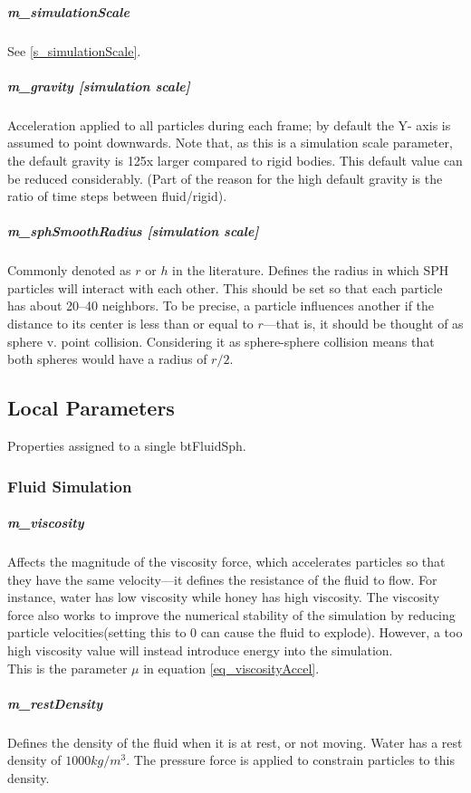 \documentclass[]{article}
\begin{document}
		\subparagraph{m\_simulationScale}
			See \ref{s_simulationScale}.
		
		\subparagraph{m\_gravity [simulation scale] }
			Acceleration applied to all particles during each frame; by default the Y- axis is assumed to point downwards.
			Note that, as this is a simulation scale parameter, the default gravity is 125x larger compared to rigid bodies. 
			This default value can be reduced considerably. (Part of the reason for the high default gravity is the ratio of 
			time steps between fluid/rigid).
		
		\subparagraph{m\_sphSmoothRadius [simulation scale]}
			Commonly denoted as \(r\) or \(h\) in the literature. Defines the radius in which SPH particles will 
			interact with each other. This should be set so that each particle has about 20--40 neighbors. To be precise, 
			a particle influences another if the distance to its center is less than or equal to \(r\)---that is, it 
			should be thought of as sphere v. point collision. Considering it as sphere-sphere collision means that both
			spheres would have a radius of \(r/2\).
		
	\subsection{Local Parameters}
		Properties assigned to a single btFluidSph.

		\subsubsection{Fluid Simulation}
			\subparagraph{m\_viscosity}
				Affects the magnitude of the viscosity force, which accelerates particles so that they have the
				same velocity---it defines the resistance of the fluid to flow. For instance, water has low viscosity while 
				honey has high viscosity. The viscosity force also works to improve the numerical stability of the simulation
				by reducing particle velocities(setting this to 0 can cause the fluid to explode). However, a too high viscosity 
				value will instead introduce energy into the simulation.\\
				
				This is the parameter \(\mu\) in equation \ref{eq_viscosityAccel}.
			
			\subparagraph{m\_restDensity}
				Defines the density of the fluid when it is at rest, or not moving. Water has a rest density
				of \(1000 kg / m^3\). The pressure force is applied to constrain particles to this density.
				
\end{document}
